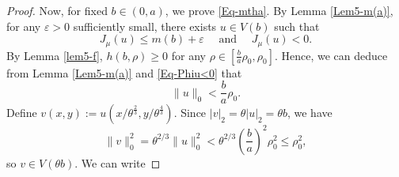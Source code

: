 \documentclass[11pt]{amsart}
\numberwithin{equation}{section}
\begin{document}
{{\begin{proof}
{Now, for fixed $b \in(0, a)$, we prove \eqref{Eq-mtha}. By Lemma \ref{Lem5-m(a)}, for any $\varepsilon>0$ sufficiently small, there exists  $u \in V(b)$ such that}
    \begin{equation}\label{Eq-Phiu<0}
        J_\mu(u) \leq m(b)+\varepsilon \quad \text { and } \quad J_\mu(u)<0.
    \end{equation}
    By Lemma \ref{lem5-f}, $h(b, \rho) \geq 0$ for any $\rho \in\left[ \frac{b}{a} \rho_0, \rho_0\right]$. Hence, we can deduce from Lemma \ref{Lem5-m(a)} and \eqref{Eq-Phiu<0} that
    $$
    \| u\|_{0}<\frac{b}{a} \rho_0.
    $$
    Define $v(x, y):=u\left(x / \theta^\frac{2}{3}, y / \theta^\frac{4}{3}\right) $. Since  $|v|_2=\theta|u|_2=\theta b$, we have
{   $$
    \| v\|_{0}^{2}=\theta^{2/3}\| u\|_{0}^{2}<\theta^{2/3}\left(\frac{b}{a} \right)^{2}\rho_0^{2}\leq\rho_0^{2},
    $$}
    so $v \in V(\theta b)$. We can write


\end{proof}}}
\end{document}
